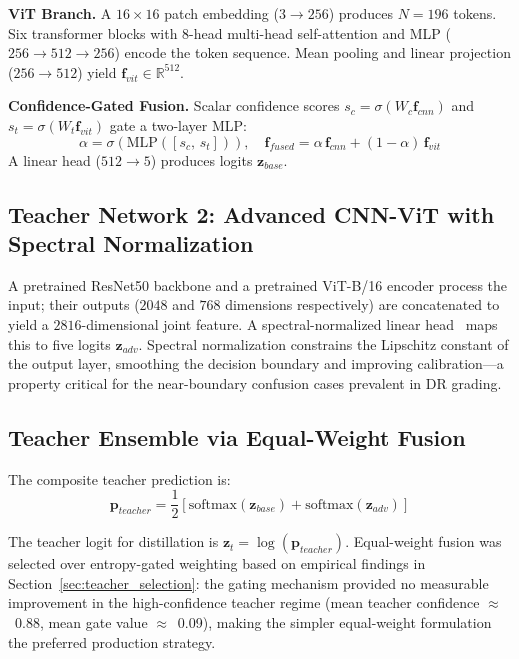 \documentclass[10pt, twocolumn]{article}
\begin{document}
\textbf{ViT Branch.} A $16{\times}16$ patch embedding ($3{\to}256$) produces
$N{=}196$ tokens. Six transformer blocks with 8-head multi-head self-attention and
MLP ($256{\to}512{\to}256$) encode the token sequence. Mean pooling and linear
projection ($256{\to}512$) yield $\mathbf{f}_{vit} \in \mathbb{R}^{512}$.

\textbf{Confidence-Gated Fusion.} Scalar confidence scores $s_c = \sigma(W_c
\mathbf{f}_{cnn})$ and $s_t = \sigma(W_t \mathbf{f}_{vit})$ gate a two-layer MLP:
\begin{equation}
  \alpha = \sigma\!\left(\text{MLP}([s_c,\, s_t])\right), \quad
  \mathbf{f}_{fused} = \alpha\, \mathbf{f}_{cnn} + (1{-}\alpha)\, \mathbf{f}_{vit}
\end{equation}
A linear head ($512{\to}5$) produces logits $\mathbf{z}_{base}$.

\subsection{Teacher Network 2: Advanced CNN-ViT with Spectral Normalization}

A pretrained ResNet50 backbone and a pretrained ViT-B/16 encoder process the input;
their outputs ($2048$ and $768$ dimensions respectively) are concatenated to yield a
$2816$-dimensional joint feature. A spectral-normalized linear head~\cite{miyato2018}
maps this to five logits $\mathbf{z}_{adv}$. Spectral normalization constrains the
Lipschitz constant of the output layer, smoothing the decision boundary and improving
calibration---a property critical for the near-boundary confusion cases prevalent in
DR grading.

\subsection{Teacher Ensemble via Equal-Weight Fusion}
\label{sec:ensemble}

The composite teacher prediction is:
\begin{equation}
  \mathbf{p}_{teacher} = \frac{1}{2}\!\left[\text{softmax}(\mathbf{z}_{base}) +
  \text{softmax}(\mathbf{z}_{adv})\right]
\end{equation}

The teacher logit for distillation is $\mathbf{z}_t = \log(\mathbf{p}_{teacher})$.
Equal-weight fusion was selected over entropy-gated weighting based on empirical
findings in Section~\ref{sec:teacher_selection}: the gating mechanism provided no
measurable improvement in the high-confidence teacher regime (mean teacher
confidence $\approx$~0.88, mean gate value $\approx$~0.09), making the simpler
equal-weight formulation the preferred production strategy.
\end{document}
